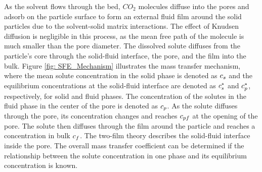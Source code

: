 \documentclass[../Article_Model_Parameters.tex]{subfiles}
\begin{document}
	
	As the solvent flows through the bed, $CO_2$ molecules diffuse into the pores and adsorb on the particle surface to form an external fluid film around the solid particles due to the solvent-solid matrix interactions. The effect of Knudsen diffusion is negligible in this process, as the mean free path of the molecule is much smaller than the pore diameter. The dissolved solute diffuses from the particle's core through the solid-fluid interface, the pore, and the film into the bulk. Figure \ref{fig: SFE_Mechanism} illustrates the mass transfer mechanism, where the mean solute concentration in the solid phase is denoted as ${\color{black}c_s}$ and the equilibrium concentrations at the solid-fluid interface are denoted as ${\color{black}c_s^*}$ and ${\color{black}c_p^*}$, respectively, for solid and fluid phases. The concentration of the solutes in the fluid phase in the center of the pore is denoted as ${\color{black}c_{p}}$. As the solute diffuses through the pore, its concentration changes and reaches ${\color{black}c_{pf}}$ at the opening of the pore. The solute then diffuses through the film around the particle and reaches a concentration in bulk ${\color{black}c_f}$. The two-film theory describes the solid-fluid interface inside the pore. The overall mass transfer coefficient can be determined if the relationship between the solute concentration in one phase and its equilibrium concentration is known.
			
\end{document}
